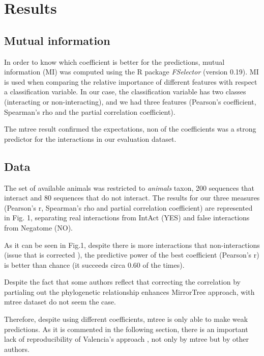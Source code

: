 \documentclass[11pt]{article}
\begin{document}
\section{Results}
\subsection{Mutual information}
In order to know which coefficient is better for the predictions, mutual information (MI) was computed using the R package \textit{FSelector} (version 0.19). MI is used when comparing the relative importance of different features with respect a classification variable. In our case, the classification variable has two classes (interacting or non-interacting), and we had three features (Pearson's coefficient, Spearman's rho and the partial correlation coefficient). 

The mtree result confirmed the expectations, non of the coefficients was a strong predictor for the interactions in our evaluation dataset.

\subsection{Data}

The set of available animals was restricted to \textit{animals} taxon, 200 sequences that interact and 80 sequences that do not interact. The results for our three measures (Pearson's r, Spearman's rho and partial correlation coefficient) are represented in Fig. 1, separating real interactions from IntAct (YES) and false interactions from Negatome (NO).

As it can be seen in Fig.1, despite there is more interactions that non-interactions (issue that is corrected ), the predictive power of the best coefficient (Pearson's r) is better than chance (it succeeds circa 0.60 of the times).

Despite the fact that some authors\cite{Sato2005} reflect that correcting the correlation by partialing out the phylogenetic relationship enhances MirrorTree approach, with mtree dataset do not seem the case.

Therefore, despite using different coefficients, mtree is only able to make weak predictions. As it is commented in the following section, there is an important lack of reproducibility of Valencia's approach \cite{Pazos2001}, not only by mtree but by other authors. 
\end{document}
